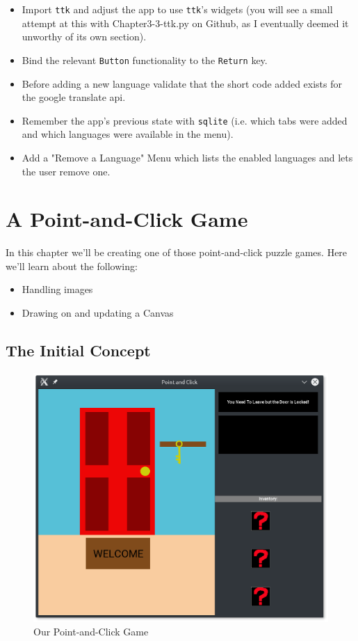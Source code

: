 \documentclass[a4paper,11pt,openany]{book}
\begin{document}
\begin{itemize}
  \item Import \lstinline[columns=fixed]{ttk} and adjust the app to use \lstinline[columns=fixed]{ttk}'s widgets (you will see a small attempt at this with Chapter3-3-ttk.py on Github, as I eventually deemed it unworthy of its own section).
  \item Bind the relevant \lstinline[columns=fixed]{Button} functionality to the \lstinline[columns=fixed]{Return} key.
  \item Before adding a new language validate that the short code added exists for the google translate api.
  \item Remember the app's previous state with \lstinline[columns=fixed]{sqlite} (i.e. which tabs were added and which languages were available in the menu).
  \item Add a "Remove a Language" Menu which lists the enabled languages and lets the user remove one.  
\end{itemize} 

\chapter{A Point-and-Click Game}
In this chapter we'll be creating one of those point-and-click puzzle games. Here we'll learn about the following:

\begin{itemize}
  \item Handling images
  \item Drawing on and updating a Canvas
\end{itemize} 

\section{The Initial Concept}

\begin{figure}[h]
\centering
\includegraphics{Ch4-1}
\caption{Our Point-and-Click Game}
\end{figure}
\end{document}
